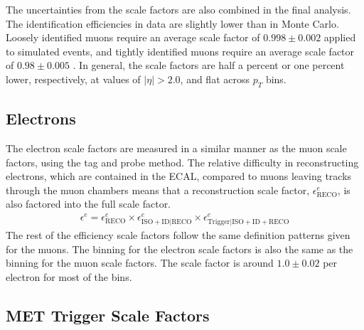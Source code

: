 The uncertainties from the scale factors are also combined in the final analysis.
The identification efficiencies in data are slightly lower than in Monte Carlo.
Loosely identified muons require an average scale factor of $0.998\pm0.002$ applied to simulated events,
and tightly identified muons require an average scale factor of $0.98\pm0.005$
\cite{CMS-DP-2019-022}.
In general, the scale factors are half a percent or one percent lower, respectively,
at values of $|\eta| > 2.0$, and flat across $p_T$ bins.

\subsection{Electrons}

The electron scale factors are measured in a similar manner as the muon scale factors,
using the tag and probe method.
The relative difficulty in reconstructing electrons, which are contained in the ECAL,
compared to muons leaving tracks through the muon chambers
means that a reconstruction scale factor, $\epsilon^e_\mathrm{RECO}$, is also factored into the full scale factor.
\begin{gather}
  \epsilon^e = \epsilon^e_\mathrm{RECO} \times \epsilon^e_\mathrm{ISO + ID|RECO} \times \epsilon^e_\mathrm{Trigger|ISO + ID + RECO}
\end{gather}
The rest of the efficiency scale factors follow the same definition patterns given for the muons.
The binning for the electron scale factors is also the same as the binning for the muon scale factors.
The scale factor is around $1.0 \pm 0.02$ per electron for most of the bins.

\subsection{MET Trigger Scale Factors}

